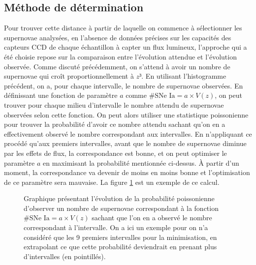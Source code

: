 \documentclass[a4paper, 12pt, svgnames]{article}
\begin{document}
\subsection{Méthode de détermination}\label{ssec:det}
Pour trouver cette distance à partir de laquelle on commence à sélectionner les
supernovae analysées, en l'absence de données précises sur les capacités des
capteurs CCD de chaque échantillon à capter un flux lumineux, l'approche qui a
été choisie repose sur la comparaison entre l'évolution attendue et l'évolution
observée. Comme discuté précédemment, on s'attend à avoir un nombre de
supernovae qui croît proportionnellement à $z³$. En utilisant l'histogramme
précédent, on a, pour chaque intervalle, le nombre de supernovae observées. En
définissant une fonction de paramètre $a$ comme $\#\text{SNe Ia} = a\times
V(z)$, on peut trouver pour chaque milieu d'intervalle le nombre attendu de
supernovae observées selon cette fonction. On peut alors utiliser une
statistique poissonienne pour trouver la probabilité d'avoir ce nombre attendu
sachant qu'on en a effectivement observé le nombre correspondant aux
intervalles. En n'appliquant ce procédé qu'aux premiers intervalles, avant que
le nombre de supernovae diminue par les effets de flux, la correspondance est
bonne, et on peut optimiser le paramètre $a$ en maximisant la probabilité
mentionnée ci-dessus. À partir d'un moment, la correspondance va devenir de
moins en moins bonne et l'optimisation de ce paramètre sera mauvaise. La figure
\ref{zmax_method} est un exemple de ce calcul.

\begin{figure}[htbp!]
    \centering
    \captionsetup{justification=centering}
    \caption{Graphique présentant l'évolution de la probabilité poissonienne
        d'observer un nombre de supernovae correspondant à la fonction
        $\#\text{SNe Ia} = a\times V(z)$ sachant que l'on en a observé le nombre
        correspondant à l'intervalle. On a ici un exemple pour on n'a considéré
        que les 9 premiers intervalles pour la minimisation, en extrapolant ce
        que cette probabilité deviendrait en prenant plus d'intervalles (en
        pointillés).}
    \label{zmax_method}
\end{figure}
\end{document}
